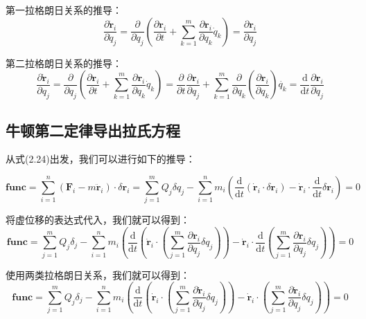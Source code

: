 \documentclass[a4paper, 10pt, openany]{book}%
\begin{document}
第一拉格朗日关系的推导：
\begin{equation}
\frac{\partial \dot{\textbf{r}}_i}{\partial \dot{q}_j}=\frac{\partial}{\partial \dot{q}_j}\left(\frac{\partial {\textbf{r}}_i}{\partial t}+\sum_{k=1}^m\frac{\partial \textbf{r}_i}{\partial q_k}\dot{q}_k\right)=\frac{\partial \textbf{r}_i}{\partial q_j}
\end{equation}

第二拉格朗日关系的推导：
\begin{equation}
\frac{\partial \dot{\textbf{r}}_i}{\partial {q}_j}=\frac{\partial}{\partial q_j}\left(\frac{\partial {\textbf{r}}_i}{\partial t}+\sum_{k=1}^m\frac{\partial \textbf{r}_i}{\partial q_k}\dot{q}_k\right)=\frac{\partial}{\partial t}\frac{\partial \textbf{r}_i}{\partial q_j}+\sum_{k=1}^m\frac{\partial}{\partial q_k}\left(\frac{\partial \textbf{r}_i}{\partial q_k}\right)\dot{q_k}=\frac{\mathrm{d}}{\mathrm{d}t}\frac{\partial \textbf{r}_i}{\partial q_j}
\end{equation}
    \subsection{牛顿第二定律导出拉氏方程}
    从式(2.24)出发，我们可以进行如下的推导：

    \begin{equation}
    \textbf{func}=\sum_{i=1}^n(\textbf{F}_i-m\ddot{\textbf{r}}_i)\cdot\delta\textbf{r}_i=\sum_{j=1}^mQ_j\delta q_j-\sum_{i=1}^n m_i (\frac{\mathrm{d}}{\mathrm{d}t}(\dot{\textbf{r}}_i\cdot \delta \textbf{r}_i)-\dot{\textbf{r}}_i\cdot \frac{\mathrm{d}}{\mathrm{d}t} \delta \textbf{r}_i)=0
    \end{equation}
    
    将虚位移的表达式代入，我们就可以得到：
    \begin{equation}
    \textbf{func}=\sum_{j=1}^{m}Q_j\delta_j-\sum_{i=1}^n m_i (\frac{\mathrm{d}}{\mathrm{d}t}(\dot{\textbf{r}}_i\cdot (\sum_{j=1}^m \frac{\partial \textbf{r}_i}{\partial q_j}\delta q_j))-\dot{\textbf{r}}_i\cdot \frac{\mathrm{d}}{\mathrm{d}t} (\sum_{j=1}^m \frac{\partial \textbf{r}_i}{\partial q_j}\delta q_j))=0
    \end{equation}
    
    使用两类拉格朗日关系，我们就可以得到：
    \begin{equation}
      \textbf{func}=\sum_{j=1}^{m}Q_j\delta_j-\sum_{i=1}^n m_i (\frac{\mathrm{d}}{\mathrm{d}t}(\dot{\textbf{r}}_i\cdot (\sum_{j=1}^m \frac{\partial \dot{\textbf{r}}_i}{\partial \dot{q}_j}\delta q_j))-\dot{\textbf{r}}_i\cdot (\sum_{j=1}^m \frac{\partial \dot{\textbf{r}}_i}{\partial q_j}\delta q_j))=0
    \end{equation}
\end{document}
